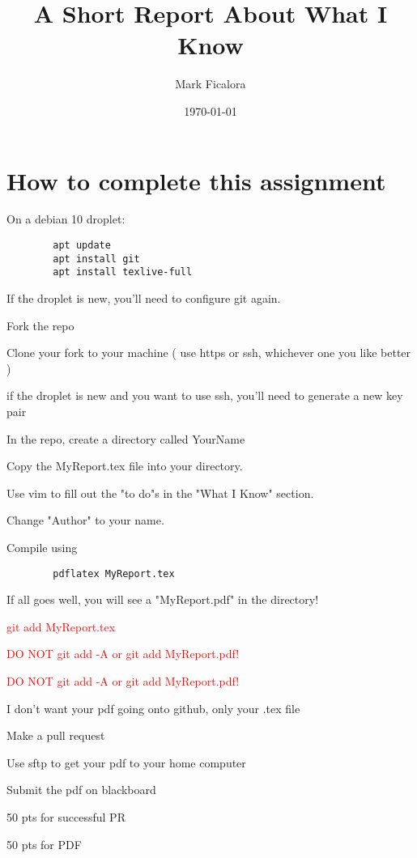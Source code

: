 \documentclass[11pt]{article}
\title{A Short Report About What I Know}
\author{ Mark Ficalora }
\date{\today}
\begin{document}
\maketitle	

\section*{How to complete this assignment}
\begin{todolist}
    \item On a debian 10 droplet:
    \begin{verbatim}
        apt update
        apt install git
        apt install texlive-full
    \end{verbatim}
    \item If the droplet is new, you'll need to configure git again.
    \item Fork the repo
    \item Clone your fork to your machine ( use https or ssh, whichever one you like better )
    \item if the droplet is new and you want to use ssh, you'll need to generate a new key pair
    \item In the repo, create a directory called YourName
    \item Copy the MyReport.tex file into your directory.
    \item Use vim to fill out the "to do"s in the "What I Know" section.
    \item Change "Author" to your name.
    \item Compile using
    \begin{verbatim}
        pdflatex MyReport.tex
    \end{verbatim}
    \item If all goes well, you will see a "MyReport.pdf" in the directory!
    \item \textcolor{red}{ git add MyReport.tex}
    \item {\Large\textcolor{red}{ DO NOT git add -A or git add MyReport.pdf!}}
    \item {\LARGE\textcolor{red}{ DO NOT git add -A or git add MyReport.pdf!}}
    \item I don't want your pdf going onto github, only your .tex  file
    \item Make a pull request
    \item Use sftp to get your pdf to your home computer
    \item Submit the pdf on blackboard
    \item 50 pts for successful PR
    \item 50 pts for PDF
\end{todolist}
\end{document}
